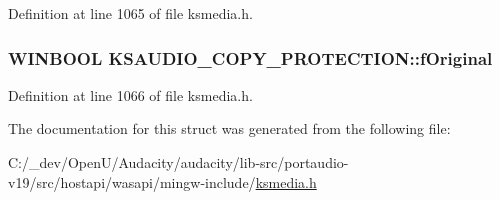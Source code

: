 Definition at line 1065 of file ksmedia.\+h.

\subsubsection[{\texorpdfstring{f\+Original}{fOriginal}}]{\setlength{\rightskip}{0pt plus 5cm}W\+I\+N\+B\+O\+OL K\+S\+A\+U\+D\+I\+O\+\_\+\+C\+O\+P\+Y\+\_\+\+P\+R\+O\+T\+E\+C\+T\+I\+O\+N\+::f\+Original}\hypertarget{struct_k_s_a_u_d_i_o___c_o_p_y___p_r_o_t_e_c_t_i_o_n_acec638d3923829b15255387a3b8a91b0}{}\label{struct_k_s_a_u_d_i_o___c_o_p_y___p_r_o_t_e_c_t_i_o_n_acec638d3923829b15255387a3b8a91b0}


Definition at line 1066 of file ksmedia.\+h.



The documentation for this struct was generated from the following file\+:\begin{DoxyCompactItemize}
\item 
C\+:/\+\_\+dev/\+Open\+U/\+Audacity/audacity/lib-\/src/portaudio-\/v19/src/hostapi/wasapi/mingw-\/include/\hyperlink{ksmedia_8h}{ksmedia.\+h}\end{DoxyCompactItemize}
